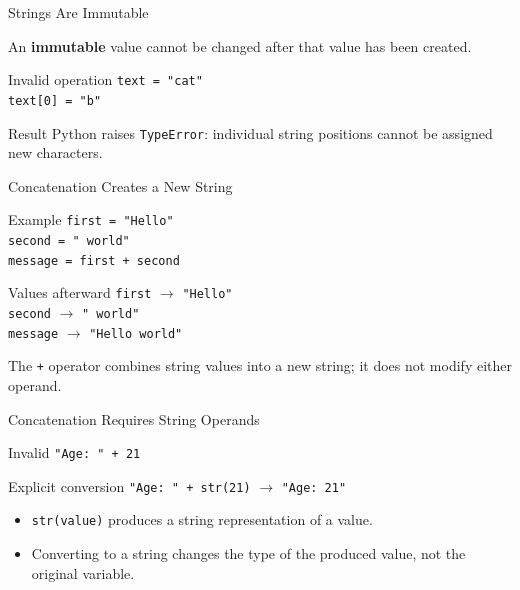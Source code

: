 \documentclass[aspectratio=169,10pt]{beamer}
\begin{document}
\begin{frame}{Strings Are Immutable}
  \begin{cpdefinition}
    An \textbf{immutable} value cannot be changed after that value has been created.
  \end{cpdefinition}

  \begin{block}{Invalid operation}
    \texttt{text = "cat"}\\
    \texttt{text[0] = "b"}
  \end{block}

  \begin{alertblock}{Result}
    Python raises \texttt{TypeError}: individual string positions cannot be assigned new characters.
  \end{alertblock}
\end{frame}

\begin{frame}{Concatenation Creates a New String}
  \begin{block}{Example}
    \texttt{first = "Hello"}\\
    \texttt{second = " world"}\\
    \texttt{message = first + second}
  \end{block}

  \begin{block}{Values afterward}
    \texttt{first} $\longrightarrow$ \texttt{"Hello"}\\
    \texttt{second} $\longrightarrow$ \texttt{" world"}\\
    \texttt{message} $\longrightarrow$ \texttt{"Hello world"}
  \end{block}

  \begin{keyidea}
    The \texttt{+} operator combines string values into a new string; it does not modify either operand.
  \end{keyidea}
\end{frame}

\begin{frame}{Concatenation Requires String Operands}
  \begin{block}{Invalid}
    \texttt{"Age: " + 21}
  \end{block}

  \begin{block}{Explicit conversion}
    \texttt{"Age: " + str(21)} $\longrightarrow$ \texttt{"Age: 21"}
  \end{block}

  \begin{itemize}
    \item \texttt{str(value)} produces a string representation of a value.
    \item Converting to a string changes the type of the produced value, not the original variable.
  \end{itemize}
\end{frame}
\end{document}
